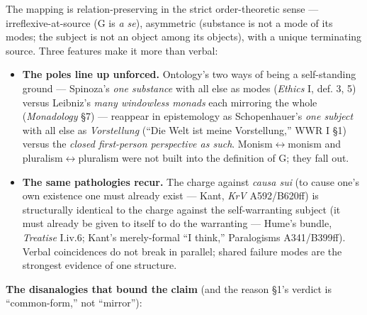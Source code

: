 \documentclass[11pt]{article}
\begin{document}
The mapping is relation-preserving in the strict order-theoretic sense — irreflexive-at-source (G is \emph{a se}), asymmetric (substance is not a mode of its modes; the subject is not an object among its objects), with a unique terminating source. Three features make it more than verbal:

\begin{itemize}
\item \textbf{The poles line up unforced.} Ontology's two ways of being a self-standing ground — Spinoza's \emph{one substance} with all else as modes (\emph{Ethics} I, def. 3, 5) versus Leibniz's \emph{many windowless monads} each mirroring the whole (\emph{Monadology} §7) — reappear in epistemology as Schopenhauer's \emph{one subject} with all else as \emph{Vorstellung} (``Die Welt ist meine Vorstellung,'' WWR I §1) versus the \emph{closed first-person perspective as such}. Monism\ensuremath{\leftrightarrow}monism and pluralism\ensuremath{\leftrightarrow}pluralism were not built into the definition of G; they fall out.
\item \textbf{The same pathologies recur.} The charge against \emph{causa sui} (to cause one's own existence one must already exist — Kant, \emph{KrV} A592/\allowbreak{}B620ff) is structurally identical to the charge against the self-warranting subject (it must already be given to itself to do the warranting — Hume's bundle, \emph{Treatise} I.iv.6; Kant's merely-formal ``I think,'' Paralogisms A341/\allowbreak{}B399ff). Verbal coincidences do not break in parallel; shared failure modes are the strongest evidence of one structure.
\end{itemize}

\textbf{The disanalogies that bound the claim} (and the reason §1's verdict is ``common-form,'' not ``mirror''):
\end{document}
